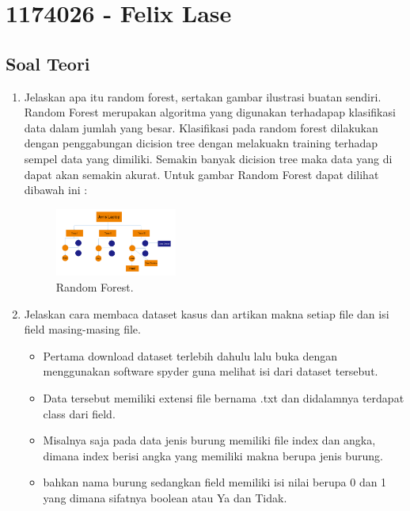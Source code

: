 \section{1174026 - Felix Lase}
\subsection{Soal Teori}
\begin{enumerate}

	\item Jelaskan apa itu random forest, sertakan gambar ilustrasi buatan sendiri.
	\hfill\break
	Random Forest merupakan algoritma yang digunakan terhadapap klasifikasi data dalam jumlah yang besar. Klasifikasi pada random forest dilakukan dengan penggabungan dicision tree dengan melakuakn training terhadap sempel data yang dimiliki. Semakin banyak dicision tree maka data yang di dapat akan semakin akurat. Untuk gambar Random Forest dapat dilihat dibawah ini :

	\begin{figure}[H]
	\centering
		\includegraphics[width=4cm]{figures/1174026/3/materi/1.PNG}
		\caption{Random Forest.}
	\end{figure}

	\item Jelaskan cara membaca dataset kasus dan artikan makna setiap file dan isi field masing-masing file.
	\hfill\break

	\begin{itemize}
		\item Pertama download dataset terlebih dahulu lalu buka dengan menggunakan software spyder guna melihat isi dari dataset tersebut.

		\item Data tersebut memiliki extensi file bernama .txt dan didalamnya terdapat class dari field.

		\item Misalnya saja pada data jenis burung memiliki file index dan angka, dimana index berisi angka yang memiliki makna berupa jenis burung.

		\item bahkan nama burung sedangkan field memiliki isi nilai berupa 0 dan 1 yang dimana sifatnya boolean atau Ya dan Tidak.


\end{itemize}
\end{enumerate}
